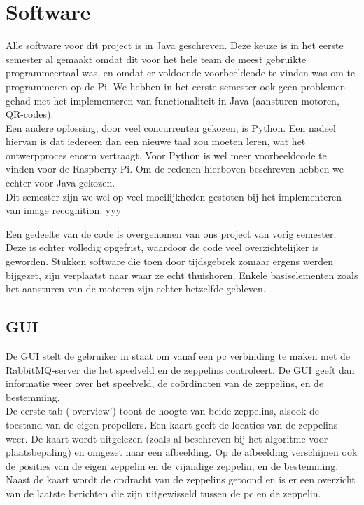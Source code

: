 \documentclass[eind]{penoverslag}
\begin{document}
\section{Software}

Alle software voor dit project is in Java geschreven. Deze keuze is in het eerste semester al gemaakt omdat dit voor het hele team de meest gebruikte programmeertaal was, en omdat er voldoende voorbeeldcode te vinden was om te programmeren op de Pi. We hebben in het eerste semester ook geen problemen gehad met het implementeren van functionaliteit in Java (aansturen motoren, QR-codes). \\
Een andere oplossing, door veel concurrenten gekozen, is Python. Een nadeel hiervan is dat iedereen dan een nieuwe taal zou moeten leren, wat het ontwerpproces enorm vertraagt. Voor Python is wel meer voorbeeldcode te vinden voor de Raspberry Pi. Om de redenen hierboven beschreven hebben we echter voor Java gekozen. \\ 
Dit semester zijn we wel op veel moeilijkheden gestoten bij het implementeren van image recognition. yyy

Een gedeelte van de code is overgenomen van ons project van vorig semester. Deze is echter volledig opgefrist, waardoor de code veel overzichtelijker is geworden. Stukken software die toen door tijdsgebrek zomaar ergens werden bijgezet, zijn verplaatst naar waar ze echt thuishoren. Enkele basiselementen zoals het aansturen van de motoren zijn echter hetzelfde gebleven.\\

\subsection{GUI}
De GUI stelt de gebruiker in staat om vanaf een pc verbinding te maken met de RabbitMQ-server die het speelveld en de zeppelins controleert. De GUI geeft dan informatie weer over het speelveld, de co\"{o}rdinaten van de zeppelins, en de bestemming. \\


De eerste tab (`overview') toont de hoogte van beide zeppelins, alsook de toestand van de eigen propellers. Een kaart geeft de locaties van de zeppelins weer. De kaart wordt uitgelezen (zoals al beschreven bij het algoritme voor plaatsbepaling) en omgezet naar een afbeelding. Op de afbeelding verschijnen ook de posities van de eigen zeppelin en de vijandige zeppelin, en de bestemming. Naast de kaart wordt de opdracht van de zeppelins getoond en is er een overzicht van de laatste berichten die zijn uitgewisseld tussen de pc en de zeppelin. \\
\end{document}
